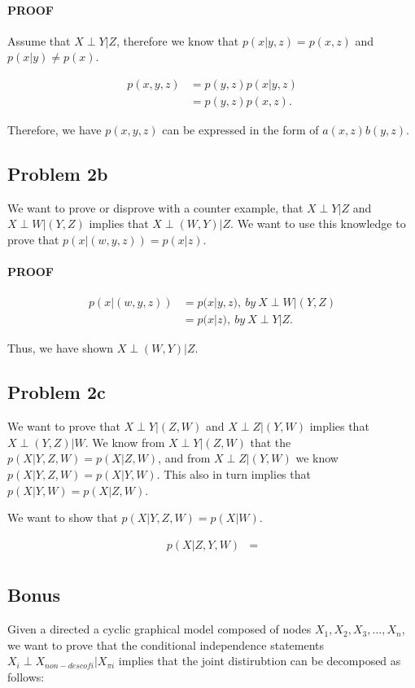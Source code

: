 \documentclass[paper=a4, fontsize=11pt]{scrartcl} %
\begin{document}
\paragraph{PROOF}
Assume that $X \perp Y|Z$, therefore we know that $p(x|y,z) = p(x,z)$ and $p(x|y) \neq p(x)$.

\begin{align}
p(x,y,z) &= p(y,z)p(x|y,z) \\
&= p(y,z)p(x,z).
\end{align}

Therefore, we have $p(x,y,z)$ can be expressed in the form of $a(x,z)b(y,z)$.

\subsection{Problem 2b}
 We want to prove or disprove with a counter example, that $X \perp Y|Z$ and $X \perp W|(Y,Z)$ implies that $X \perp (W,Y)|Z$.
We want to use this knowledge to prove that $p(x|(w,y,z)) = p(x|z)$.

\paragraph{PROOF}
\begin{align}
p(x|(w,y,z)) &= p(x|y,z),\ by \ X \perp W|(Y,Z) \\
&= p(x|z), \ by \  X \perp Y|Z.
\end{align}

Thus, we have shown $X \perp (W,Y)|Z$.

\subsection{Problem 2c}
We want to prove that $X \perp Y|(Z,W)$ and $X \perp Z|(Y,W)$ implies that $X \perp (Y,Z)|W$.  
We know from $X \perp Y|(Z,W)$ that the $p(X|Y,Z,W) = p(X|Z,W)$, and from $X \perp Z|(Y,W)$ we know $p(X|Y,Z,W) = p(X|Y,W)$.
This also in turn implies that $p(X|Y,W) = p(X|Z,W)$.

We want to show that $p(X|Y,Z,W) = p(X|W)$.

\begin{align}
p(X|Z,Y,W) &= \\
\end{align}


\subsection{Bonus}
Given a directed a cyclic graphical model composed of nodes $X_1,X_2,X_3,...,X_n$, we want to prove that the conditional independence statements $X_i \perp X_{non-desc of i}|X_{\pi i}$ implies that the joint distirubtion can be decomposed as follows:
\end{document}
